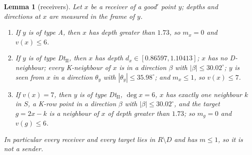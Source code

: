 \documentclass[11pt]{amsart}
\newtheorem{lemma}[theorem]{Lemma}
\theoremstyle{definition}
\theoremstyle{remark}
\begin{document}
\begin{lemma}[receivers]\label{lem:IIrecv}
Let $x$ be a receiver of a good$'$ point $y$; depths and directions at $x$ are measured in the frame of $y$.
\begin{enumerate}[label=\textup{(\alph*)}]
\item If $y$ is of type A, then $x$ has depth greater than $1.73$, so $m_x=0$ and $v(x)\le6$.
\item If $y$ is of type Dt$_{\mathrm{II}}$, then $x$ has depth $d_x\in[0.86597,1.10413]$; $x$ has no D-neighbour; every K-neighbour of $x$ is in a direction $\beta$ with $|\beta|\le30.02^\circ$; $y$ is seen from $x$ in a direction $\theta_y$ with $|\theta_y|\le35.98^\circ$; and $m_x\le1$, so $v(x)\le7$.
\item If $v(x)=7$, then $y$ is of type Dt$_{\mathrm{II}}$, $\deg x=6$, $x$ has exactly one neighbour $k$ in $S$, a K-row point in a direction $\beta$ with $|\beta|\le30.02^\circ$, and the target $g=2x-k$ is a neighbour of $x$ of depth greater than $1.73$; so $m_g=0$ and $v(g)\le6$.
\end{enumerate}
In particular every receiver and every target lies in $R\setminus D$ and has $m\le1$, so it is not a sender.
\end{lemma}
\end{document}
